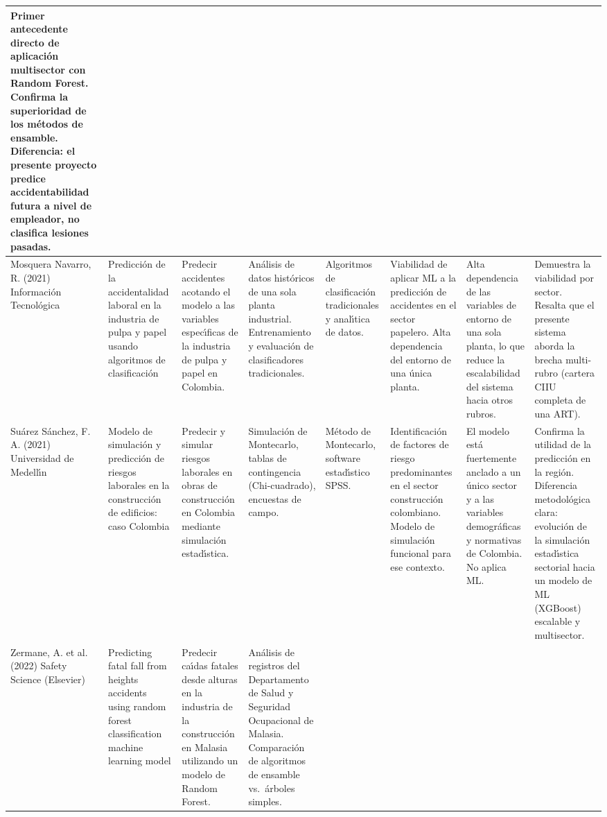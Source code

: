 \begin{landscape}
\begin{longtable}{@{}p{1.6cm}p{2.4cm}p{2.2cm}p{2.4cm}p{2cm}p{2.2cm}p{2.4cm}p{2.6cm}@{}}
		Primer antecedente directo de aplicaci\'on multisector con Random Forest. Confirma la superioridad de los m\'etodos de ensamble. Diferencia: el presente proyecto predice accidentabilidad futura a nivel de empleador, no clasifica lesiones pasadas. \\
		\hline
		Mosquera Navarro, R. (2021) Informaci\'on Tecnol\'ogica &
		Predicci\'on de la accidentalidad laboral en la industria de pulpa y papel usando algoritmos de clasificaci\'on &
		Predecir accidentes acotando el modelo a las variables espec\'{\i}ficas de la industria de pulpa y papel en Colombia. &
		An\'alisis de datos hist\'oricos de una sola planta industrial. Entrenamiento y evaluaci\'on de clasificadores tradicionales. &
		Algoritmos de clasificaci\'on tradicionales y anal\'{\i}tica de datos. &
		Viabilidad de aplicar ML a la predicci\'on de accidentes en el sector papelero. Alta dependencia del entorno de una \'unica planta. &
		Alta dependencia de las variables de entorno de una sola planta, lo que reduce la escalabilidad del sistema hacia otros rubros. &
		Demuestra la viabilidad por sector. Resalta que el presente sistema aborda la brecha multi-rubro (cartera CIIU completa de una ART). \\
		\hline
		Su\'arez S\'anchez, F. A. (2021) \parencite{suarez2021} Universidad de Medell\'{\i}n &
		Modelo de simulaci\'on y predicci\'on de riesgos laborales en la construcci\'on de edificios: caso Colombia &
		Predecir y simular riesgos laborales en obras de construcci\'on en Colombia mediante simulaci\'on estad\'{\i}stica. &
		Simulaci\'on de Montecarlo, tablas de contingencia (Chi-cuadrado), encuestas de campo. &
		M\'etodo de Montecarlo, software estad\'{\i}stico SPSS. &
		Identificaci\'on de factores de riesgo predominantes en el sector construcci\'on colombiano. Modelo de simulaci\'on funcional para ese contexto. &
		El modelo est\'a fuertemente anclado a un \'unico sector y a las variables demogr\'aficas y normativas de Colombia. No aplica ML. &
		Confirma la utilidad de la predicci\'on en la regi\'on. Diferencia metodol\'ogica clara: evoluci\'on de la simulaci\'on estad\'{\i}stica sectorial hacia un modelo de ML (XGBoost) escalable y multisector. \\
		\hline
		Zermane, A. et al. (2022) Safety Science (Elsevier) &
		Predicting fatal fall from heights accidents using random forest classification machine learning model &
		Predecir ca\'{\i}das fatales desde alturas en la industria de la construcci\'on en Malasia utilizando un modelo de Random Forest. &
		An\'alisis de registros del Departamento de Salud y Seguridad Ocupacional de Malasia. Comparaci\'on de algoritmos de ensamble vs.\ \'arboles simples. &

\end{longtable}
\end{landscape}

